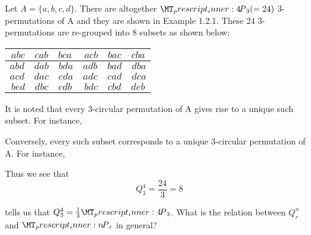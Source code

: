 \documentclass[a4paper,11pt]{book}
\newcommand\perm[2][^n]{\prescript{#1\mkern-2.5mu}{}P_{#2}}
\begin{document}
Let $A = \{a,b,c,d\}$. There are altogether $\perm[4]{3}(= 24)$ 
3-permutations of A and they are shown in Example 1.2.1. These 24 3-permutations are re-grouped into 8 subsets as shown below: 
\begin{center}
\begin{tabular}{ |c|c| } 
 \hline
 $abc\quad cab\quad  bca$ &  $acb\quad  bac\quad  cba$\\
\hline   
 $abd\quad  dab\quad  bda$ &  $adb\quad  bad\quad  dba$\\ 
 \hline
$acd\quad  dac\quad  cda$ & $adc\quad  cad\quad  dca$\\
\hline 
$bed\quad  dbc\quad  cdb$ & $bdc\quad  cbd\quad  deb$ \\ 
 \hline
\end{tabular}
\end{center}
It is noted that every 3-circular permutation of A gives rise to a unique such subset. For instance, 
\begin{center}
\end{center}
Conversely, every such subset corresponds to a unique 3-circular permutation of A. For instance, 
\begin{center}
\end{center}
Thus we see that 
\[Q_{3}^{4} = \frac{24}{3} =8 \]
\begin{example}
tells us that $Q_{3}^{4} = \frac{1}{3} \perm[4]{3}$. What is the relation between $Q_{r}^{n} $ and $\perm[n]{r}$ in general? 
\end{example}
\end{document}
